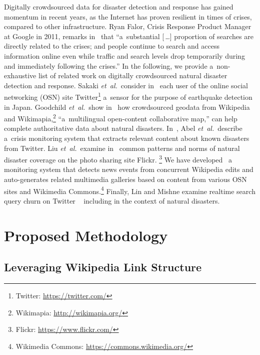 \documentclass[runningheads,a4paper]{llncs}
\begin{document}
Digitally crowdsourced data for disaster detection and response
has gained momentum in recent years,
as the Internet has proven resilient in times of crises,
compared to other infrastructure.
Ryan Falor, Crisis Response Product Manager at Google in 2011,
remarks in~\cite{falor2011googleorg} that
``a~substantial \textup{[\,\dots]} proportion of searches
are directly related to the crises;
and people continue to search and access information online
even while traffic and search levels drop temporarily
during and immediately following the crises.''
In the following, we provide a~non-exhaustive list of related work
on digitally crowdsourced natural disaster detection and response.
Sakaki \emph{et~al.}\ consider in~\cite{sakaki2010earthquake} each user
of the online social networking (OSN) site
Twitter\footnote{Twitter: \url{https://twitter.com/}} a~sensor
for the purpose of earthquake detection in Japan.
Goodchild \emph{et~al.}\ show in~\cite{goodchild2010crowdsourcing}
how crowdsourced geodata from Wikipedia and
Wikimapia,\footnote{Wikimapia: \url{http://wikimapia.org/}}
``a~multilingual open-content collaborative map,''
can help complete authoritative data about natural disasters.
In~\cite{abel2012twitcident}, Abel \emph{et~al.}\ describe
a~crisis monitoring system that extracts relevant content
about known disasters from Twitter.
Liu \emph{et~al.}\ examine in~\cite{liu2008search}
common patterns and norms of natural disaster coverage
on the photo sharing site Flickr.%
\footnote{Flickr: \url{https://www.flickr.com/}}
We have developed~\cite{steiner2014thesis} a~ monitoring system
that detects news events from concurrent Wikipedia edits
and auto-generates related multimedia galleries
based on content from various OSN sites
and Wikimedia Commons.\footnote{Wikimedia Commons: \url{https://commons.wikimedia.org/}}
Finally, Lin and Mishne examine realtime search query churn on Twitter%
~\cite{lin2012churn} including in the context of natural disasters.

\section{Proposed Methodology}

\subsection{Leveraging Wikipedia Link Structure}
\end{document}
